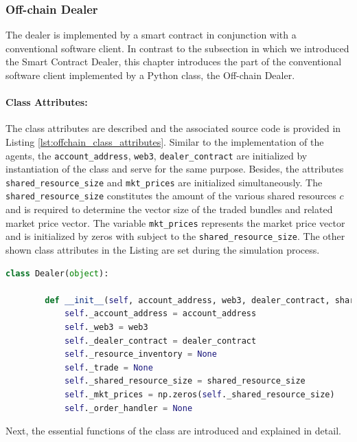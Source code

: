 \subsubsection{Off-chain Dealer}
\label{sec:off_chain_component}
The dealer is implemented by a smart contract in conjunction with 
a conventional software client. 
In contrast to the subsection in which we introduced the Smart Contract Dealer, 
this chapter introduces the part of the conventional software client implemented 
by a Python class, the Off-chain Dealer.

\paragraph{Class Attributes:} The class attributes are described and the associated source code
is provided in Listing \ref{lst:offchain_class_attributes}.
Similar to the implementation of the agents, the \verb|account_address|, \verb|web3|, 
\verb|dealer_contract| are initialized by instantiation of the class and serve for 
the same purpose. Besides, the attributes \verb|shared_resource_size| and \verb|mkt_prices|
are initialized simultaneously. The \verb|shared_resource_size| constitutes the amount 
of the various shared resources $c$ and is required to determine the vector size 
of the traded bundles and related market price vector. 
The variable \verb|mkt_prices| represents the market price vector and is initialized by zeros with subject to
the \verb|shared_resource_size|. The other shown class attributes in the Listing are set during the
simulation process.

\begin{lstlisting}[float=htbp, label=lst:offchain_class_attributes, caption=Class Attributes of Off-chain Dealer, language=Python]
    class Dealer(object):

        def __init__(self, account_address, web3, dealer_contract, shared_resource_size):
            self._account_address = account_address
            self._web3 = web3
            self._dealer_contract = dealer_contract
            self._resource_inventory = None
            self._trade = None
            self._shared_resource_size = shared_resource_size
            self._mkt_prices = np.zeros(self._shared_resource_size)
            self._order_handler = None
\end{lstlisting}

Next, the essential functions of the class are introduced and explained in detail.\\


